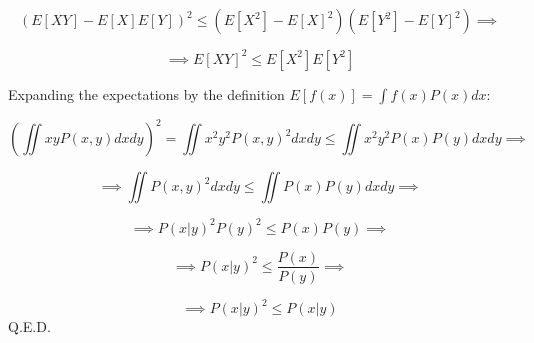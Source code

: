 \documentclass[a4paper]{article}
\begin{document}
$$
(E[XY] - E[X]E[Y])^2 \leq (E[X^2] - E[X]^2)(E[Y^2] - E[Y]^2) \implies
$$

$$
\implies E[XY]^2 \leq E[X^2]E[Y^2]
$$

Expanding the expectations by the definition $E[f(x)] = \int f(x) P(x) dx$:

$$
(\iint xy P(x,y) dx dy)^2 = \iint x^2y^2 P(x,y)^2 dx dy \leq \iint x^2 y^2 P(x) P(y) dx dy  \implies 
$$

$$
\implies \iint P(x,y) ^ 2 dx dy \leq \iint P(x) P(y) dx dy \implies
$$

$$
\implies P(x|y) ^ 2 P(y) ^ 2 \leq P(x) P(y) \implies 
$$

$$
\implies P(x|y) ^ 2 \leq \frac{P(x)}{P(y)} \implies 
$$

$$
\implies  P(x|y) ^ 2 \leq P(x|y)
$$
Q.E.D.
\end{document}
